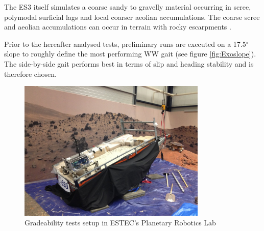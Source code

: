 \documentclass[a4paper,twocolumn]{esapub2005} %
\begin{document}
The ES3 itself simulates a coarse sandy to gravelly material occurring in
scree, polymodal surficial lags and local coarser aeolian accumulations. The
coarse scree and aeolian accumulations can occur in terrain with rocky
escarpments \cite{michaud2014}.




Prior to the hereafter analysed tests, preliminary runs are executed on a
17.5$^{\circ}$ slope to roughly define the most performing WW gait (see figure
\ref{fig:Exoslope}).  The side-by-side gait performs best in terms of slip and
heading stability and is therefore chosen. 

\begin{figure}[b!]
    \centering
    \includegraphics[width=0.8\textwidth]{trailersetup.jpg}
    \caption{Gradeability tests setup in ESTEC's Planetary Robotics Lab}
    \label{fig:trailer}
\end{figure}
\end{document}
